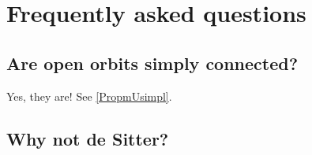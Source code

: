 %
   \section{Frequently asked questions}
%

\subsection{Are open orbits simply connected?}

Yes, they are! See \ref{PropmUsimpl}.

\subsection{Why not de Sitter?}

